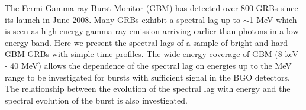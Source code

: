 


\bigskip



\bigskip

\noindent The Fermi Gamma-ray Burst Monitor (GBM) has detected over 800 GRBs since its launch in June 2008. Many GRBs exhibit a spectral lag up to $\sim$1 MeV which is seen as high-energy gamma-ray emission arriving earlier than photons in a low-energy band. Here we present the spectral lags of a sample of bright and hard GBM GRBs with simple time profiles. The wide energy coverage of GBM (8 keV - 40 MeV) allows the dependence of the spectral lag on energies up to the MeV range to be investigated for bursts with sufficient signal in the BGO detectors. The relationship between the evolution of the spectral lag with energy and the spectral evolution of the burst is also investigated.

